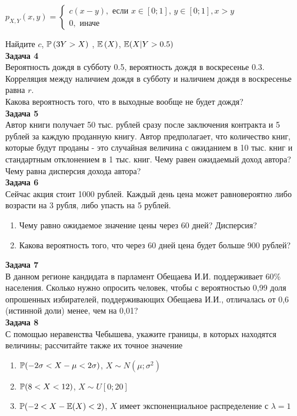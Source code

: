 \documentclass[12pt, a4paper]{article}\usepackage[]{graphicx}\usepackage[]{color}
\begin{document}
$p_{X,Y} \left(x,y\right)=\left\{\begin{array}{l} {c(x-y),
\text{ если } x\in \left[0;1\right],\, y\in \left[0;1\right], x>y} \\
{0,\text{ иначе} } \end{array}\right. $

Найдите  $c$, $\P\left(3Y>X\right)$ ,  $\E\left(X\right)$, $\E(X|Y>0.5)$ \\



\textbf{Задача 4} \\
Вероятность дождя в субботу 0.5, вероятность дождя в воскресенье 0.3. Корреляция между наличием дождя в субботу и наличием дождя в воскресенье равна $r$. \\
Какова вероятность того, что в выходные вообще не будет дождя? \\



\textbf{Задача 5} \\ %
Автор книги получает 50 тыс. рублей сразу после заключения
контракта и 5 рублей за каждую проданную книгу. Автор
предполагает, что количество книг, которые будут проданы - это
случайная величина с ожиданием в 10 тыс. книг и стандартным
отклонением в 1 тыс. книг. Чему равен ожидаемый доход автора? Чему
равна дисперсия дохода автора?\\



\textbf{Задача 6} \\ %
Сейчас акция стоит 1000 рублей. Каждый день цена может равновероятно либо возрасти на 3 рубля, либо упасть на 5 рублей.
\begin{enumerate}
\item Чему равно ожидаемое значение цены через 60 дней? Дисперсия?
\item Какова вероятность того, что через 60 дней цена будет больше 900 рублей?
\end{enumerate}


\textbf{Задача 7} \\ %
 В данном регионе кандидата в парламент Обещаева И.И.
поддерживает 60\% населения. Сколько нужно опросить человек, чтобы
с вероятностью 0,99 доля  опрошенных избирателей, поддерживающих
Обещаева И.И.,  отличалась от 0,6 (истинной доли) менее, чем на
0,01?  \\


\textbf{Задача 8} \\ %
С помощью неравенства Чебышева, укажите границы, в которых
находятся величины; рассчитайте также их точное значение
\begin{enumerate}
\item  $\P(-2\sigma<X-\mu<2\sigma)$, $X\sim N(\mu;\sigma^{2})$
\item  $\P(8<X<12)$, $X\sim U[0;20]$
\item $\P(-2<X-\E(X)<2)$, $X$ имеет экспоненциальное распределение с
$\lambda=1$
\end{enumerate}
\end{document}
